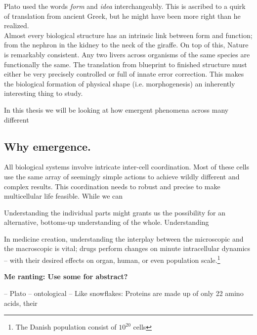 Plato used the words \textit{form} and \textit{idea} interchangeably. This is ascribed to a quirk of translation from ancient Greek, but he might have been more right than he realized.\\ Almost every biological structure has an intrinsic link between form and function; from the nephron in the kidney to the neck of the giraffe.  
On top of this, Nature is remarkably consistent. Any two livers across organisms of the same species are functionally the same. The translation from blueprint to finished structure must either be very precisely controlled or full of innate error correction. This makes the biological formation of physical shape (i.e. morphogenesis) an inherently interesting thing to study. 



In this thesis we will be looking at how emergent phenomena across many different 


\subsection{Why emergence. }



All biological systems involve intricate inter-cell coordination. Most of these cells use the same array of seemingly simple actions to achieve wildly different and complex results. This coordination needs to robust and precise to make multicellular life feasible. While we can 

Understanding the individual parts might grants us the possibility for an alternative, bottoms-up understanding of the whole. Understanding  


In medicine creation, understanding the interplay between the microscopic and the macroscopic is vital; drugs perform changes on minute intracellular dynamics -- with their desired effects on organ, human, or even population scale.\footnote{The Danish population consist of $10^{20}$ cells}




\textbf{Me ranting: Use some for abstract?}

 -- Plato -- ontological --
Like snowflakes:
Proteins are made up of only 22 amino acids, their 

